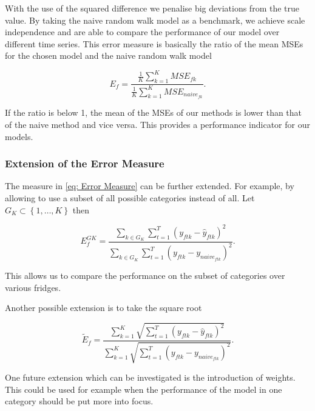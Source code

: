 With the use of the squared difference we penalise big deviations from the true value. By taking the naive random walk model as a benchmark, we achieve scale independence and are able to compare the performance of our model over different time series. This error measure is basically the ratio of the mean MSEs for the chosen model and the naive random walk model

\begin{equation}
E_f=\frac{\frac{1}{K}\sum_{k=1}^K MSE_{fk}}{\frac{1}{K}\sum_{k=1}^K MSE_{naive_{fk}}}.
\label{eq: Error Measure MSE}
\end{equation}

If the ratio is below 1, the mean of the MSEs of our methods is lower than that of the naive method and vice versa. This provides a performance indicator for our models. 

\subsubsection{Extension of the Error Measure}
\label{sec:Error Measure Extension}

The measure in \ref{eq: Error Measure} can be further extended. For example, by allowing to use a subset of all possible categories instead of all. Let $G_K \subset \left\{1,\ldots,K\right\}$ then

\begin{equation}
E^{GK}_{f}=\frac{\sum_{k \in G_K}\sum_{t=1}^T(y_{ftk}-\hat{y}_{ftk})^2}{\sum_{k \in G_K}\sum_{t=1}^T(y_{ftk}-y_{naive_{ftk}})^2}.
\label{eq: Error Measure Subsets}
\end{equation}

This allows us to compare the performance on the subset of categories over various fridges. 

Another possible extension is to take the square root

\begin{equation}
\widetilde{E}_f=\frac{\sum_{k=1}^{K}\sqrt{\sum_{t=1}^T(y_{ftk}-\hat{y}_{ftk})^2}}{\sum_{k=1}^{K}\sqrt{\sum_{t=1}^T(y_{ftk}-y_{naive_{ftk}})^2}}.
\label{eq: Error Measure Sqrt} 
\end{equation}

One future extension which can be investigated is the introduction of weights. This could be used for example when the performance of the model in one category should be put more into focus. 